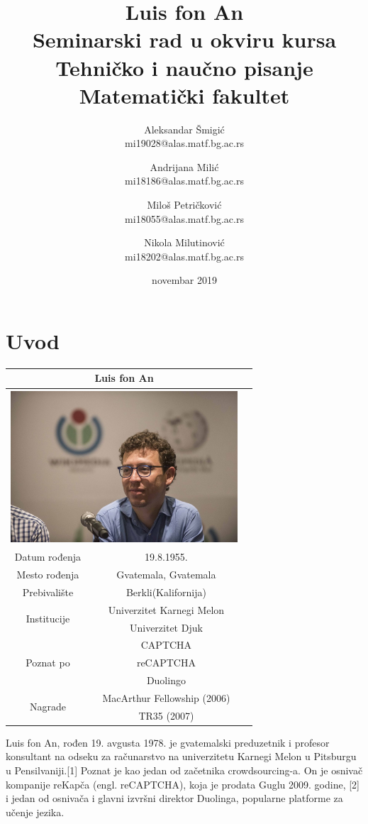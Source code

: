 \documentclass[titlepage, 12pt]{article}
\title{Luis fon An\\ \small{Seminarski rad u okviru kursa\\Tehničko i naučno pisanje\\ Matematički fakultet}}
\author{Aleksandar Šmigić \\ mi19028@alas.matf.bg.ac.rs \and Andrijana Milić \\ mi18186@alas.matf.bg.ac.rs \and Miloš Petričković \\ mi18055@alas.matf.bg.ac.rs \and Nikola Milutinović \\ mi18202@alas.matf.bg.ac.rs}
\date{novembar 2019}
\begin{document}
\maketitle

\tableofcontents
\newpage
\section{Uvod}

{\renewcommand{\arraystretch}{1.2}}
\begin{tabular}{|c|c|c|}
\hline
\multicolumn{2}{|c|}{\Large{Luis fon An}}\\[4px]
\hline
\multicolumn{2}{|c|}{\includegraphics[width=320px,height=216px]{Luis_von_Ahn.jpg}}\\

\hline
Datum rođenja & 19.8.1955. \\
\hline
Mesto rođenja & Gvatemala, Gvatemala\\
\hline
Prebivalište & Berkli(Kalifornija)\\
\hline
\multirow{2}{*}{Institucije}&Univerzitet Karnegi Melon\\
& Univerzitet Djuk \\
\hline 
\multirow{3}{*}{Poznat po} & CAPTCHA \\
& reCAPTCHA \\ & Duolingo \\
\hline
\multirow{2}{*}{Nagrade} & MacArthur Fellowship (2006) \\
 & TR35 (2007)
\\
\hline
\end{tabular}

\vspace{20px}

Luis fon An, rođen 19. avgusta 1978. je gvatemalski preduzetnik i profesor konsultant na odseku za računarstvo na univerzitetu Karnegi Melon u Pitsburgu u Pensilvaniji.[1] Poznat je kao jedan od začetnika crowdsourcing-a. On je osnivač kompanije reKapča (engl. reCAPTCHA), koja je prodata Guglu 2009. godine, [2] i jedan od osnivača i glavni izvršni direktor Duolinga, popularne platforme za učenje jezika. 
\end{document}
